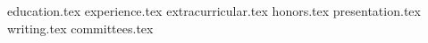 \documentclass[11pt, a4paper]{awesome-cv}
\newcommand*{\sectiondir}{resume/}
\begin{document}
\makecvheader

{education.tex}
{experience.tex}
{extracurricular.tex}
{honors.tex}
{presentation.tex}
{writing.tex}
{committees.tex}
\end{document}
